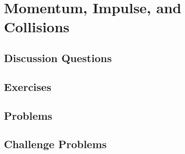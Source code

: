 
\chapter{Momentum, Impulse, and Collisions}

\section{Discussion Questions}

\section{Exercises}

\section{Problems}

\section{Challenge Problems}
